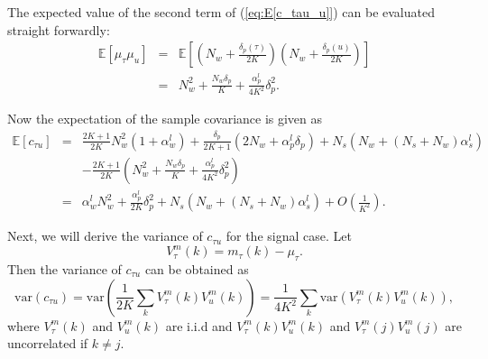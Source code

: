 \documentclass[draftclsnofoot,onecolumn,12pt]{IEEEtran}
\begin{document}
  The expected value of the second term of (\ref{eq:E[c_tau_u]}) can be evaluated straight forwardly:
  \begin{eqnarray}
    \mathbb{E}[\mu_\tau \mu_u] &=& \mathbb{E}\left[ \left( N_w + \frac{\delta_p (\tau) }{2K} \right) \left( N_w + \frac{\delta_p(u)}{2K} \right) \right] \nonumber \\
	  &=& N_w^2 + \frac{N_w \delta_p}{K} + \frac{\alpha_p^l}{4K^2} \delta_p^2 \label{eq:Emumu}.
  \end{eqnarray}

  Now the expectation of the sample covariance is given as
  \begin{eqnarray}
    \mathbb{E}[c_{\tau u}] &=& \frac{2K+1}{2K} N_w^2 \left( 1 + \alpha_w^l \right) + \frac{\delta_p}{2K+1} (2N_w + \alpha_p^l \delta_p)
      + N_s \left( N_w + \left(N_s+N_w\right) \alpha_s^l \right) \nonumber \\
      & & - \frac{2K+1}{2K} \left( N_w^2 + \frac{N_w\delta_p}{K} + \frac{\alpha_p^l}{4K^2}\delta_p^2 \right) \nonumber \\
      &=& \alpha_w^l N_w^2 + \frac{\alpha_p^l}{2K}\delta_p^2 + N_s \left(N_w + (N_s + N_w)\alpha_s^l \right) + O(\frac{1}{K^2}). \label{eq:Ectu_sigPf} 
\end{eqnarray}



  Next, we will derive the variance of $c_{\tau u}$ for the signal case. Let
  \begin{equation}
    V_{\tau}^m (k) = m_\tau(k) - \mu_\tau.
    \label{eq:V_tu_k}
  \end{equation}
  Then the variance of $c_{\tau u}$ can be obtained as
\begin{equation}
\mathrm{var}(c_{\tau u}) = \mathrm{var}\left(\frac{1}{2K}\sum_k V_{\tau}^m(k) V_{u}^m(k) \right) 
    = \frac{1}{4K^2} \sum_k \mathrm{var}\left(V_{\tau}^m(k) V_{u}^m(k) \right),
    \label{eq:Vctu_def}
  \end{equation}
where $V_{\tau}^m(k)$ and $V_{u}^m(k)$ are i.i.d and $V_{\tau}^m(k) V_{u}^m(k)$ and $V_{\tau}^m(j) V_{u}^m(j)$ are uncorrelated if $k \neq j$.
\end{document}
